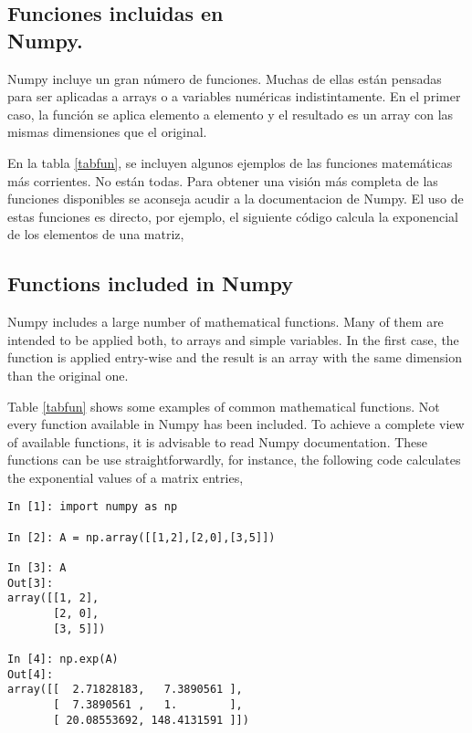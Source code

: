 \begin{paracol}{2}
\subsection{Funciones incluidas en\\ Num\-py.} 
Numpy incluye un gran número de funciones. Muchas de ellas  están pensadas para ser aplicadas a arrays o a variables numéricas indistintamente. En el primer caso, la función se aplica elemento a elemento y el resultado es un array con las mismas dimensiones que el original. 

En la tabla \ref{tabfun}, se incluyen algunos ejemplos de las funciones matemáticas más corrientes. No están todas. Para obtener una visión más completa de las funciones disponibles se aconseja acudir a la documentacion de Numpy.
El uso de estas funciones es directo, por ejemplo, el siguiente código calcula la exponencial de los elementos de una matriz,
\switchcolumn
\subsection{Functions included in Numpy}
Numpy includes a large number of mathematical functions. Many of them are intended to be applied both, to arrays and simple variables. In the first case, the function is applied entry-wise and the result is an array with the same dimension than the original one.

Table \ref{tabfun} shows some examples of common mathematical functions. Not every function available in Numpy has been included. To achieve a complete view of available functions, it is advisable to read Numpy documentation.
These functions can be use straightforwardly, for instance, the following code calculates the exponential values of a matrix entries,   
\end{paracol}

\begin{center}
    \begin{minipage}{0.5\textwidth}
        \begin{verbatim}
In [1]: import numpy as np

In [2]: A = np.array([[1,2],[2,0],[3,5]])

In [3]: A
Out[3]: 
array([[1, 2],
       [2, 0],
       [3, 5]])

In [4]: np.exp(A)
Out[4]: 
array([[  2.71828183,   7.3890561 ],
       [  7.3890561 ,   1.        ],
       [ 20.08553692, 148.4131591 ]])
        \end{verbatim}
    \end{minipage}
\end{center}

